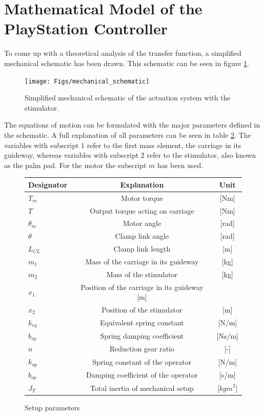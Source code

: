 \section{Mathematical Model of the PlayStation Controller}
To come up with a theoretical analysis of the transfer function, a simplified mechanical schematic has been drawn. This schematic can be seen in figure \ref{fig:mechanical_schematic}.
\begin{figure}[h!]
	\centering
	\texttt{[image: Figs/mechanical\_schematic]}
	\caption{Simplified mechanical schematic of the actuation system with the stimulator.}
	\label{fig:mechanical_schematic}
\end{figure}

The equations of motion can be formulated with the major parameters defined in the schematic. A full explanation of all parameters can be seen in table \ref{tab:setup_params}. The variables with subscript $1$ refer to the first mass element, the carriage in its guideway, whereas variables with subscript $2$ refer to the stimulator, also known as the palm pad. For the motor the subscript $m$ has been used.
	
\begin{figure}[h!]
	\centering
	\begin{tabular}{|l|c|c|}%
		\hline
		 Designator & Explanation & Unit \\ \hline \hline
		$T_m$ & Motor torque & [Nm]\\ 
		$T$ & Output torque acting on carriage& [Nm]\\
		$\theta_m$ & Motor angle & [rad]\\
		$\theta$ & Clamp link angle & [rad]\\  
		$L_{CL}$ & Clamp link length & [m]\\
		$m_{1}$ & Mass of the carriage in its guideway & [kg]\\
		$m_{2}$ & Mass of the stimulator & [kg]\\
		$x_{1}$ & Position of the carriage in its guideway [m]\\
		$x_{2}$ & Position of the stimulator & [m]\\
		$k_{eq}$ & Equivalent spring constant & [N/m]\\		$b_{sp}$ & Spring damping coefficient & [Ns/m]\\
		$n$ & Reduction gear ratio & [-]\\
		$k_{op}$ & Spring constant of the operator & [N/m]\\
		$b_{op}$ & Damping coefficient of the operator & [s/m]\\
		$J_T$ & Total inertia of mechanical setup & [$\textit{kgm}^2$]\\
		\hline
	\end{tabular}
	\caption{Setup parameters}
	\label{tab:setup_params}
\end{figure}
	
